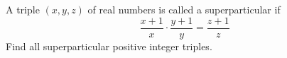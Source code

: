 A triple $(x,y,z)$ of real numbers is called a superparticular if$$\frac{x+1}{x} \cdot \frac{y+1}{y}=\frac{z+1}{z}$$Find all superparticular positive integer triples.